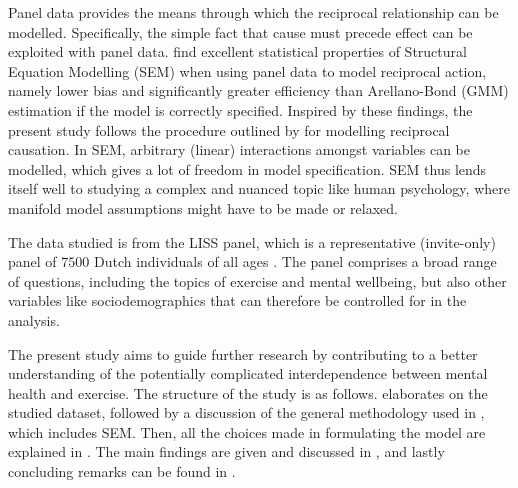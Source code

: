 Panel data provides the means through which the reciprocal relationship can be modelled. Specifically, the simple fact
that cause must precede effect can be exploited with panel data.
 find excellent statistical properties of Structural Equation Modelling (SEM)
when using panel data to model reciprocal action, namely lower bias and significantly greater efficiency than Arellano-Bond
(GMM) estimation if the model is correctly specified.
Inspired by these findings, the present study follows the procedure outlined by 
for modelling reciprocal causation.
In SEM, arbitrary (linear) interactions amongst variables can be modelled, which gives a lot of freedom in model
specification. SEM thus lends itself well to studying a complex and nuanced topic like human psychology,
where manifold model assumptions might have to be made or relaxed.

The data studied is from the LISS panel, which is a representative (invite-only) panel of $7500$ Dutch individuals
of all ages \cite{scherpenzeel2010liss}. The panel comprises a broad range of questions, including the topics of exercise
and mental wellbeing, but also other variables like sociodemographics that can therefore be controlled for in the analysis.

The present study aims to guide further research by contributing to a better understanding of the potentially
complicated interdependence between mental health and exercise.
The structure of the study is as follows.
 elaborates on the studied dataset, followed by a discussion of the
general methodology used in , which includes SEM.
Then, all the choices made in formulating the model are explained in .
The main findings are given and discussed in ,
and lastly concluding remarks can be found in .
